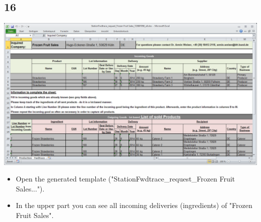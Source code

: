 \documentclass{beamer}
\begin{document}
\subsection{16}
\begin{frame}
	\begin{center}
  		\includegraphics[height=0.6\textheight]{16.png}
	\end{center}
	\begin{itemize}
		\item Open the generated template ("StationFwdtrace\_request\_Frozen Fruit Sales...").
		\item In the upper part you can see all incoming deliveries (ingredients) of "Frozen Fruit Sales".
	\end{itemize}
\end{frame}
\end{document}
